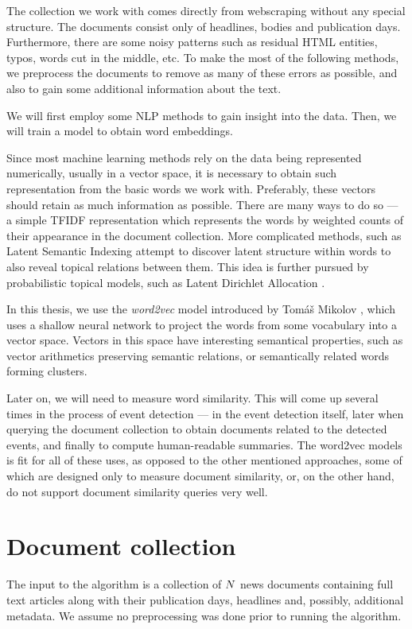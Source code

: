 The collection we work with comes directly from webscraping without any special structure. The documents consist only of headlines, bodies and publication days. Furthermore, there are some noisy patterns such as residual HTML entities, typos, words cut in the middle, etc. To make the most of the following methods, we preprocess the documents to remove as many of these errors as possible, and also to gain some additional information about the text.

We will first employ some NLP methods to gain insight into the data. Then, we will train a model to obtain word embeddings.

Since most machine learning methods rely on the data being represented numerically, usually in a vector space, it is necessary to obtain such representation from the basic words we work with. Preferably, these vectors should retain as much information as possible. There are many ways to do so --- a simple TFIDF representation \cite{information-retrieval} which represents the words by weighted counts of their appearance in the document collection. More complicated methods, such as Latent Semantic Indexing \cite{lsi} attempt to discover latent structure within words to also reveal topical relations between them. This idea is further pursued by probabilistic topical models, such as Latent Dirichlet Allocation \cite{lda}.

In this thesis, we use the \textit{word2vec} model introduced by Tomáš Mikolov \cite{distributed-representations, linguistic-regularities, word2vec}, which uses a shallow neural network to project the words from some vocabulary into a vector space. Vectors in this space have interesting semantical properties, such as vector arithmetics preserving semantic relations, or semantically related words forming clusters.

Later on, we will need to measure word similarity. This will come up several times in the process of event detection --- in the event detection itself, later when querying the document collection to obtain documents related to the detected events, and finally to compute human-readable summaries. The word2vec models is fit for all of these uses, as opposed to the other mentioned approaches, some of which are designed only to measure document similarity, or, on the other hand, do not support document similarity queries very well.


\section{Document collection}
The input to the algorithm is a collection of $N$ news documents containing full text articles along with their publication days, headlines and, possibly, additional metadata. We assume no preprocessing was done prior to running the algorithm.

